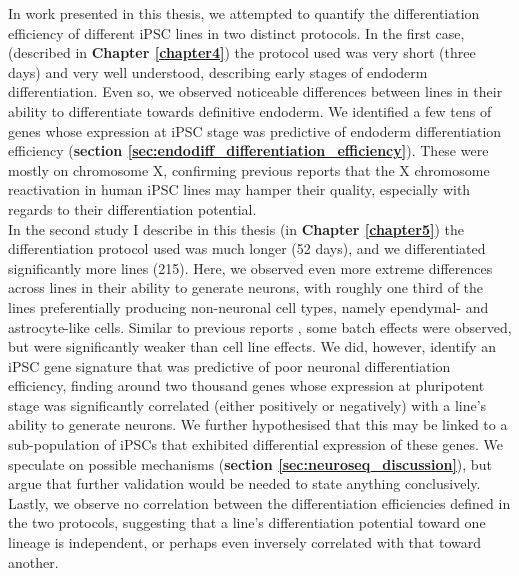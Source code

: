 In work presented in this thesis, we attempted to quantify the differentiation efficiency of different iPSC lines in two distinct protocols.
In the first case, (described in \textbf{Chapter 
\ref{chapter4}})
the protocol used was very short (three days) and very well understood, describing early stages of endoderm differentiation.
Even so, we observed noticeable differences between lines in their ability to differentiate towards definitive endoderm.
We identified a few tens of
genes whose expression at iPSC stage was predictive of endoderm differentiation efficiency (\textbf{section \ref{sec:endodiff_differentiation_efficiency}}).
These were mostly on chromosome X, confirming previous reports that the X chromosome reactivation in human iPSC lines may hamper their quality, especially with regards to their differentiation potential.\\

In the second study I describe in this thesis (in \textbf{Chapter \ref{chapter5}})
the differentiation protocol used was much longer (52 days), and we differentiated significantly more lines (215).
Here, we observed even more extreme differences across lines in their ability to generate neurons, with roughly one third of the lines preferentially producing non-neuronal cell types, namely ependymal- and astrocyte-like cells.
Similar to previous reports \cite{schwartzentruber2018molecular}, some batch effects were observed, but were significantly weaker than cell line effects.
We did, however, identify an iPSC gene signature that was predictive of poor neuronal differentiation efficiency, finding around two thousand genes whose expression at pluripotent stage was significantly correlated (either positively or negatively) with a line's ability to generate neurons. 
We further hypothesised that this may be linked to a sub-population of iPSCs that exhibited differential expression of these genes.
We speculate on possible mechanisms (\textbf{section
\ref{sec:neuroseq_discussion}}),
but argue that further validation would be needed to state anything conclusively.
Lastly, we observe no correlation between the differentiation efficiencies defined in the two protocols, suggesting that a line's differentiation potential toward one lineage is independent, or perhaps even inversely correlated with that toward another. \\

